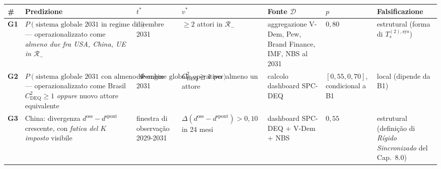 {\def\LTcaptype{none} %
{\small\begin{longtable}[]{@{}
  >{\raggedright\arraybackslash}p{}
  >{\raggedright\arraybackslash}p{}
  >{\raggedright\arraybackslash}p{}
  >{\raggedright\arraybackslash}p{}
  >{\raggedright\arraybackslash}p{}
  >{\raggedright\arraybackslash}p{}
  >{\raggedright\arraybackslash}p{}@{}}
\toprule\noalign{}
\begin{minipage}[b]{\linewidth}\raggedright
\#
\end{minipage} & \begin{minipage}[b]{\linewidth}\raggedright
Predizione
\end{minipage} & \begin{minipage}[b]{\linewidth}\raggedright
\(t^*\)
\end{minipage} & \begin{minipage}[b]{\linewidth}\raggedright
\(v^*\)
\end{minipage} & \begin{minipage}[b]{\linewidth}\raggedright
Fonte \(\mathcal{D}\)
\end{minipage} & \begin{minipage}[b]{\linewidth}\raggedright
\(p\)
\end{minipage} & \begin{minipage}[b]{\linewidth}\raggedright
Falsificazione
\end{minipage} \\
\midrule\noalign{}
\endhead
\bottomrule\noalign{}
\endlastfoot
\textbf{G1} &
\(P(\text{sistema globale 2031 in regime di decoerenza generalizzata})\)
--- operazionalizzato come \emph{almeno due fra USA, China, UE in
\(\mathcal{R}_-\)} & dicembre 2031 & \(\geq 2\) attori in
\(\mathcal{R}_-\) & aggregazione V-Dem, Pew, Brand Finance, IMF, NBS al
2031 & \(0{,}80\) & estrutural (forma di \(T_s^{(2),\text{sys}}\)) \\
\textbf{G2} &
\(P(\text{sistema globale 2031 con almeno un $\Phi$-engine globale operativo})\)
--- operazionalizzato come Brasil \(C_{\text{DEQ}}^2 \geq 1\)
\emph{oppure} nuovo attore equivalente & dicembre 2031 &
\(C_{\text{DEQ}}^2 \geq 1\) per almeno un attore & calcolo dashboard
SPC-DEQ & \([0{,}55, 0{,}70]\), condicional a B1 & local (dipende da
B1) \\
\textbf{G3} & China: divergenza \(d^{\text{oss}} - d^{\text{spont}}\)
crescente, con \emph{fatica del \(K\) imposto} visibile & finestra di
observação 2029-2031 &
\(\Delta(d^{\text{oss}} - d^{\text{spont}}) > 0{,}10\) in 24 mesi &
dashboard SPC-DEQ + V-Dem + NBS & \(0{,}55\) & estrutural (definição
di \emph{Rígido Sincronizado} del Cap.~8.0) \\
\end{longtable}}
}

